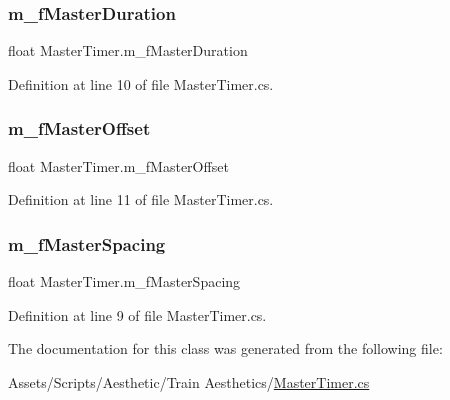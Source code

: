 \subsubsection{\texorpdfstring{m\+\_\+f\+Master\+Duration}{m\_fMasterDuration}}
{\footnotesize\ttfamily float Master\+Timer.\+m\+\_\+f\+Master\+Duration}



Definition at line 10 of file Master\+Timer.\+cs.

\mbox{\label{class_master_timer_a318b40ad59086995734f0d8ee789ac76}} 
\subsubsection{\texorpdfstring{m\+\_\+f\+Master\+Offset}{m\_fMasterOffset}}
{\footnotesize\ttfamily float Master\+Timer.\+m\+\_\+f\+Master\+Offset}



Definition at line 11 of file Master\+Timer.\+cs.

\mbox{\label{class_master_timer_a5bc844dfb40680ddffc9986ad6d4a32c}} 
\subsubsection{\texorpdfstring{m\+\_\+f\+Master\+Spacing}{m\_fMasterSpacing}}
{\footnotesize\ttfamily float Master\+Timer.\+m\+\_\+f\+Master\+Spacing}



Definition at line 9 of file Master\+Timer.\+cs.



The documentation for this class was generated from the following file\+:\begin{DoxyCompactItemize}
\item 
Assets/\+Scripts/\+Aesthetic/\+Train Aesthetics/\mbox{\hyperlink{_master_timer_8cs}{Master\+Timer.\+cs}}\end{DoxyCompactItemize}
